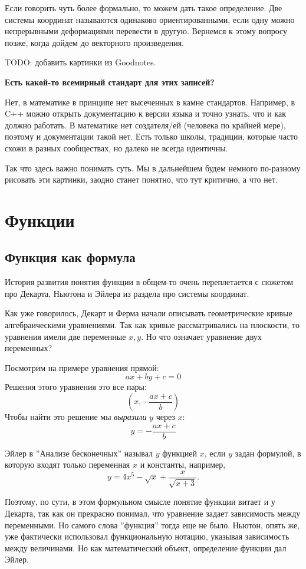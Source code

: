 \documentclass[a4paper,12pt]{article}
\begin{document}
Если говорить чуть более формально, то можем дать такое определение. Две системы координат называются одинаково ориентированными, если одну можно непрерывными деформациями перевести в другую. Вернемся к этому вопросу позже, когда дойдем до векторного произведения.

TODO: добавить картинки из Goodnotes.

\noindent\textbf{Есть какой-то всемирный стандарт для этих записей?}

Нет, в математике в принципе нет высеченных в камне стандартов. Например, в C++ можно открыть документацию к версии языка и точно узнать, что и как должно работать. В математике нет создателя/ей (человека по крайней мере), поэтому и документации такой нет. Есть только школы, традиции, которые часто схожи в разных сообществах, но далеко не всегда идентичны.

Так что здесь важно понимать суть. Мы в дальнейшем будем немного по-разному рисовать эти картинки, заодно станет понятно, что тут критично, а что нет.

\section*{Функции}
\subsection*{Функция как формула}
История развития понятия функции в общем-то очень переплетается с сюжетом про Декарта, Ньютона и Эйлера из раздела про системы координат.

Как уже говорилось, Декарт и Ферма начали описывать геометрические кривые алгебраическими уравнениями. Так как кривые рассматривались на плоскости, то уравнения имели две переменные $x,y$. Но что означает уравнение двух переменных?

Посмотрим на примере уравнения прямой:
\[
ax+by + c= 0
\]
Решения этого уравнения это все пары:
\[
(x, -\frac{ax +c}{b})
\]
Чтобы найти это решение мы \textit{выразили} $y$ через $x$:
\[
y = -\frac{ax+c}{b}
\]

Эйлер в ''Анализе бесконечных'' называл $y$ функцией $x$, если $y$ задан формулой, в которую входят только переменная $x$ и константы, например,
\[
y = 4x^5 - \sqrt{x} + \frac{x}{\sqrt{x+3}}.
\]

Поэтому, по сути, в этом формульном смысле понятие функции витает и у Декарта, так как он прекрасно понимал, что уравнение задает зависимость между переменными. Но самого слова ''функция'' тогда еще не было. Ньютон, опять же, уже фактически использовал функциональную нотацию, указывая зависимость между величинами. Но как математический объект, определение функции дал Эйлер.
\end{document}
